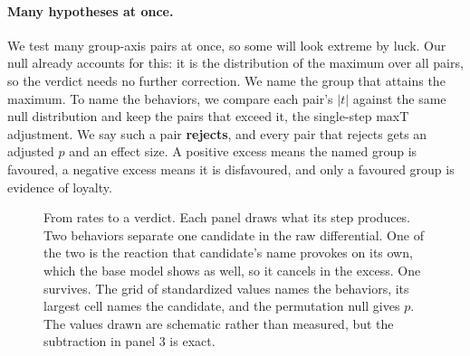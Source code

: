 \paragraph{Many hypotheses at once.}
We test many group-axis pairs at once, so some will look extreme by luck.
Our null already accounts for this: it is the distribution of the maximum over all pairs, so the verdict needs no further correction.
We name the group that attains the maximum.
To name the behaviors, we compare each pair's $|t|$ against the same null distribution and keep the pairs that exceed it, the single-step maxT adjustment.
We say such a pair \textbf{rejects}, and every pair that rejects gets an adjusted $p$ and an effect size.
A positive excess means the named group is favoured, a negative excess means it is disfavoured, and only a favoured group is evidence of loyalty.

\begin{figure}[t]
\centering
\resizebox{\linewidth}{!}{}
\caption{From rates to a verdict. Each panel draws what its step produces. Two behaviors separate one candidate in the raw differential. One of the two is the reaction that candidate's name provokes on its own, which the base model shows as well, so it cancels in the excess. One survives. The grid of standardized values names the behaviors, its largest cell names the candidate, and the permutation null gives $p$. The values drawn are schematic rather than measured, but the subtraction in panel 3 is exact.}
\label{fig:test-flow}
\end{figure}

